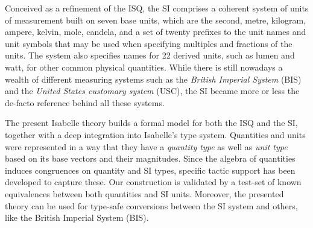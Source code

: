 \documentclass[11pt,a4paper]{book}
\begin{document}
Conceived as a refinement of the ISQ, the SI comprises a coherent system of units of measurement built
 on seven base units, which are the second, metre, kilogram, ampere, kelvin, mole, candela, and a 
set of twenty prefixes to the unit names and unit symbols that may be used when specifying multiples 
and fractions of the units. The system also specifies names for 22 derived units, such as lumen and 
watt, for other common physical quantities. While there is still nowadays a wealth of different 
measuring systems such as the \emph{British Imperial System} (BIS) and the \emph{United States 
customary system} (USC), the SI became more or less the de-facto reference behind all these systems.

The present Isabelle theory builds a formal model for both the ISQ and the SI, together with a 
deep integration into Isabelle's type system. Quantities and units were represented in a way that 
they have a  \emph{quantity type} as well as \emph{unit type} based on its 
base vectors and their magnitudes. Since the algebra of quantities induces congruences on 
quantity and SI types, specific tactic support has been developed to capture these.
Our construction is validated by a test-set of known equivalences between both quantities and SI units.
Moreover, the presented theory can be used for type-safe conversions between the SI system and
others, like the British Imperial System (BIS).

% 
\end{document}
